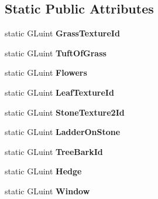 \subsection*{\-Static \-Public \-Attributes}
\begin{DoxyCompactItemize}
\item 
\hypertarget{structGameTexture_a2eb4e1f8b49df08bab6da38010dcac69}{static \-G\-Luint {\bfseries \-Grass\-Texture\-Id}}\label{structGameTexture_a2eb4e1f8b49df08bab6da38010dcac69}

\item 
\hypertarget{structGameTexture_a936c6c7146ba919be51f8f3c33777225}{static \-G\-Luint {\bfseries \-Tuft\-Of\-Grass}}\label{structGameTexture_a936c6c7146ba919be51f8f3c33777225}

\item 
\hypertarget{structGameTexture_a159d393ceca2ed1b6d9b470844698c50}{static \-G\-Luint {\bfseries \-Flowers}}\label{structGameTexture_a159d393ceca2ed1b6d9b470844698c50}

\item 
\hypertarget{structGameTexture_a2c28a6a26068c37ea3b1f33eb6393eda}{static \-G\-Luint {\bfseries \-Leaf\-Texture\-Id}}\label{structGameTexture_a2c28a6a26068c37ea3b1f33eb6393eda}

\item 
\hypertarget{structGameTexture_acaf71d22e769c12f8ada73d748f54386}{static \-G\-Luint {\bfseries \-Stone\-Texture2\-Id}}\label{structGameTexture_acaf71d22e769c12f8ada73d748f54386}

\item 
\hypertarget{structGameTexture_a2d646a68617fcd389749951b5e2b0e7e}{static \-G\-Luint {\bfseries \-Ladder\-On\-Stone}}\label{structGameTexture_a2d646a68617fcd389749951b5e2b0e7e}

\item 
\hypertarget{structGameTexture_ad647eb8e713a5552739b9362a7cbd53f}{static \-G\-Luint {\bfseries \-Tree\-Bark\-Id}}\label{structGameTexture_ad647eb8e713a5552739b9362a7cbd53f}

\item 
\hypertarget{structGameTexture_a55c73e92a176db210d7785ba81b6d00f}{static \-G\-Luint {\bfseries \-Hedge}}\label{structGameTexture_a55c73e92a176db210d7785ba81b6d00f}

\item 
\hypertarget{structGameTexture_af3050a255c271887c6cabb5736263faf}{static \-G\-Luint {\bfseries \-Window}}\label{structGameTexture_af3050a255c271887c6cabb5736263faf}


\end{DoxyCompactItemize}
